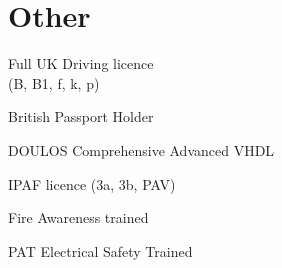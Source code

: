 \documentclass[]{deedy-resume-openfont-wjl}
\begin{document}
  \section{Other}
  \vspace{-\topsep} %
  \begin{flushleft}
  \begin{multicols}{3}
  \begin{tightemize}
      \item Full UK Driving licence\\ (B, B1, f, k, p)
      \item British Passport Holder
      \item DOULOS Comprehensive Advanced VHDL
      \item IPAF licence (3a, 3b, PAV)
      \item Fire Awareness trained
      \item PAT Electrical Safety Trained
    \end{tightemize}
  \end{multicols}
  \end{flushleft}

\vspace{-\topsep} %
\noindent\makebox[\linewidth]{\color{headings}\rule{\paperwidth}{0.1pt}}

%
%
\end{document}
